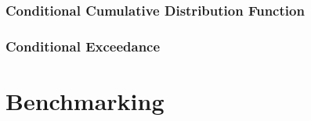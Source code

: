 \documentclass{beamer}
\begin{document}
\begin{frame}
  \frametitle{Conditional Cumulative Distribution Function}
\end{frame}

\begin{frame}
  \frametitle{Conditional Exceedance}
\end{frame}


\section{Benchmarking}
\end{document}
